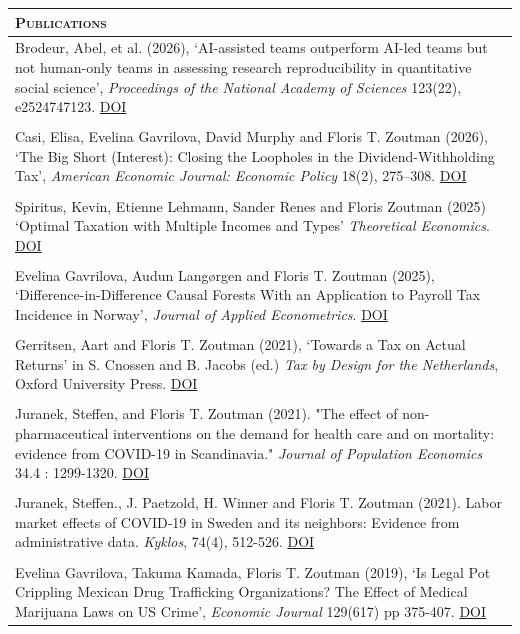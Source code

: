 \documentclass [11pt]{article}
\newcommand{\thickrule}{\toprule}
\newcommand{\ttitle}[1]{\scshape{\Large {#1}}}
\begin{document}
\begin{tabular}[t] { p{16.75cm}  }
\ttitle{Publications}
\\
\thickrule
Brodeur, Abel, et al. (2026), `AI-assisted teams outperform AI-led teams but not human-only teams in assessing research reproducibility in quantitative social science', \emph{Proceedings of the National Academy of Sciences} 123(22), e2524747123. \href{https://doi.org/10.1073/pnas.2524747123}{DOI}
\\
\\
Casi, Elisa, Evelina Gavrilova, David Murphy and Floris T. Zoutman (2026), `The Big Short (Interest): Closing the Loopholes in the Dividend-Withholding Tax', \emph{American Economic Journal: Economic Policy} 18(2), 275--308. \href{https://doi.org/10.1257/pol.20230547}{DOI}
\\
\\
Spiritus, Kevin, Etienne Lehmann, Sander Renes and Floris Zoutman (2025) `Optimal Taxation with Multiple Incomes and Types' \emph{Theoretical Economics}. \href{https://doi.org/10.3982/TE5479}{DOI}
\\
\\
Evelina Gavrilova, Audun Langørgen and Floris T. Zoutman (2025), `Difference-in-Difference Causal Forests With an Application to Payroll Tax Incidence in Norway', \emph{Journal of Applied Econometrics}. \href{https://doi.org/10.1002/jae.70001}{DOI}
\\
\\
Gerritsen, Aart and Floris T. Zoutman (2021), `Towards a Tax on Actual Returns' in S. Cnossen and B. Jacobs (ed.) \emph{Tax by Design for the Netherlands}, Oxford University Press. \href{https://doi.org/10.1093/oso/9780192855244.003.0002}{DOI}
\\
\\
Juranek, Steffen, and Floris T. Zoutman (2021). "The effect of non-pharmaceutical interventions on the demand for health care and on mortality: evidence from COVID-19 in Scandinavia." \emph{Journal of Population Economics} 34.4 : 1299-1320. \href{https://doi.org/10.1007/s00148-021-00868-9}{DOI}
\\
\\
Juranek, Steffen., J. Paetzold, H. Winner and Floris T. Zoutman (2021). Labor market effects of COVID‐19 in Sweden and its neighbors: Evidence from administrative data. \emph{Kyklos}, 74(4), 512-526. \href{https://doi.org/10.1111/kykl.12282}{DOI}
\\
\\
Evelina Gavrilova, Takuma Kamada, Floris T. Zoutman (2019), `Is Legal Pot Crippling Mexican Drug Trafficking Organizations? The Effect of Medical Marijuana Laws on US Crime', \emph{Economic Journal} 129(617) pp 375-407. \href{https://doi.org/10.1111/ecoj.12521}{DOI}

\end{tabular}
\end{document}
